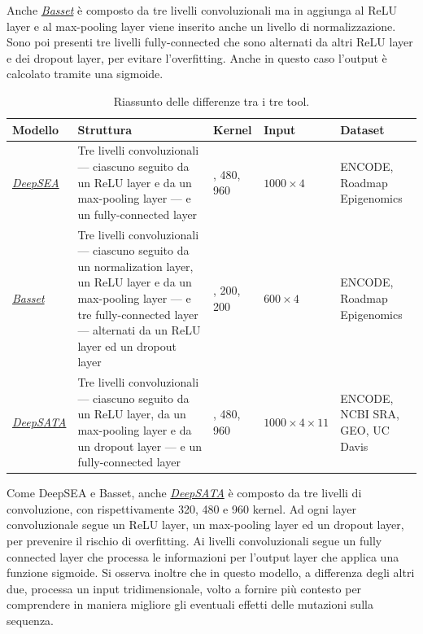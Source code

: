 Anche \hyperref[sec:Basset]{\textsl{Basset}} è composto da tre livelli convoluzionali ma in aggiunga al \acs{ReLU} layer e al max-pooling layer viene inserito anche un livello di normalizzazione. Sono poi presenti tre livelli fully-connected che sono alternati da altri \acs{ReLU} layer e dei dropout layer, per evitare l'overfitting. Anche in questo caso l'output è calcolato tramite una sigmoide.
% 
\begin{table}[!t]
    \centering
    \caption{Riassunto delle differenze tra i tre tool.}\label{tab:summary}
    \renewcommand{\arraystretch}{2}
    \begin{tabular}{|>{\centering\arraybackslash}m{2cm}|>{\centering\arraybackslash}m{4.5cm}|>{\centering\arraybackslash}m{1.5cm}|>{\centering\arraybackslash}m{1.5cm}|>{\centering\arraybackslash}m{3cm}|} %
        \hline %
        \textbf{Modello} & \textbf{Struttura} & \textbf{Kernel} & \textbf{Input} & \textbf{Dataset} \\ 
        \hline\hline %
        \hyperref[sec:DeepSEA]{\textsl{DeepSEA}} & Tre livelli convoluzionali — ciascuno seguito da un \acs{ReLU} layer e da un max-pooling layer — e un fully-connected layer  &  320, 480, 960 & $1000\times 4$ & \acs{ENCODE}, Roadmap Epigenomics\\ 
        \hyperref[sec:Basset]{\textsl{Basset}} & Tre livelli convoluzionali — ciascuno seguito da un normalization layer, un \acs{ReLU} layer e da un max-pooling layer — e tre fully-connected layer — alternati da un \acs{ReLU} layer ed un dropout layer &  300, 200, 200 & $600 \times 4$ & \acs{ENCODE}, Roadmap Epigenomics\\ 
        \hyperref[sec:DeepSATA]{\textsl{DeepSATA}} & Tre livelli convoluzionali — ciascuno seguito da un \acs{ReLU} layer, da un max-pooling layer e da un dropout layer — e un fully-connected layer & 320, 480, 960 & $1000\times 4\times 11$ & \acs{ENCODE}, \acs{NCBI} \acs{SRA}, \acs{GEO}, UC Davis\\ 
        \hline
    \end{tabular}
    \renewcommand{\arraystretch}{1}
\end{table}

Come DeepSEA e Basset, anche \hyperref[sec:DeepSATA]{\textsl{DeepSATA}} è composto da tre livelli di convoluzione, con rispettivamente 320, 480 e 960 kernel. Ad ogni layer convoluzionale segue un \acs{ReLU} layer, un max-pooling layer ed un dropout layer, per prevenire il rischio di overfitting. Ai livelli convoluzionali segue un fully connected layer che processa le informazioni per l'output layer che applica una funzione sigmoide. Si osserva inoltre che in questo modello, a differenza degli altri due, processa un input tridimensionale, volto a fornire più contesto per comprendere in maniera migliore gli eventuali effetti delle mutazioni sulla sequenza.

